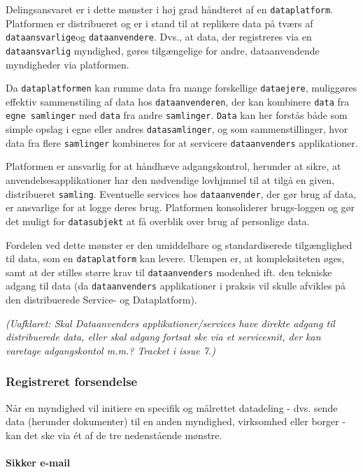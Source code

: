 Delingsansvaret er i dette mønster i høj grad håndteret af en
\texttt{dataplatform}. Platformen er distribueret og er i stand til at
replikere data på tværs af \texttt{dataansvarlige}og
\texttt{dataanvendere}. Dvs., at data, der registreres via en
\texttt{dataansvarlig} myndighed, gøres tilgængelige for andre,
dataanvendende myndigheder via platformen.

Da \texttt{dataplatformen} kan rumme data fra mange forskellige
\texttt{dataejere}, muliggøres effektiv sammenstiling af data hos
\texttt{dataanvenderen}, der kan kombinere \texttt{data} fra
\texttt{egne\ samlinger} med \texttt{data} fra andre \texttt{samlinger}.
\texttt{Data} kan her forstås både som simple opslag i egne eller andres
\texttt{datasamlinger}, og som sammenstillinger, hvor data fra flere
\texttt{samlinger} kombineres for at servicere \texttt{dataanvenders}
applikationer.

Platformen er ansvarlig for at håndhæve adgangskontrol, herunder at
sikre, at anvendelsesapplikationer har den nødvendige lovhjmmel til at
tilgå en given, distribueret \texttt{samling}. Eventuelle services hos
\texttt{dataanvender}, der gør brug af data, er ansvarlige for at logge
deres brug. Platformen konsoliderer brugs-loggen og gør det muligt for
\texttt{datasubjekt} at få overblik over brug af personlige data.

Fordelen ved dette mønster er den umiddelbare og standardiserede
tilgænglighed til data, som en \texttt{dataplatform} kan levere. Ulempen
er, at kompleksiteten øges, samt at der stilles større krav til
\texttt{dataanvenders} modenhed ift. den tekniske adgang til data (da
\texttt{dataanvenders} applikationer i praksis vil skulle afvikles på
den distribuerede Service- og Dataplatform).

\emph{(Uafklaret: Skal Dataanvenders applikationer/services have direkte
adgang til distribuerede data, eller skal adgang fortsat ske via et
servicesnit, der kan varetage adgangskontol m.m.? Tracket i issue 7.)}

\subsubsection{Registreret forsendelse}\label{registreret-forsendelse}

Når en myndighed vil initiere en specifik og målrettet datadeling - dvs.
sende data (herunder dokumenter) til en anden myndighed, virksomhed
eller borger - kan det ske via ét af de tre nedenstående mønstre.

\paragraph{Sikker e-mail}\label{sikker-e-mail}

